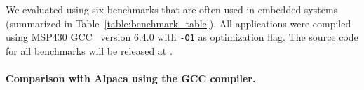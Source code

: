 
We evaluated \sys using six benchmarks that are often used in embedded systems (summarized in Table~\ref{table:benchmark_table}). All applications were compiled using MSP430 GCC~\cite{ti-gcc} version 6.4.0 with \texttt{-O1} as optimization flag. The source code for all benchmarks will be released at \cite{coala_website}.

\paragraph{Comparison with Alpaca using the GCC compiler.}

